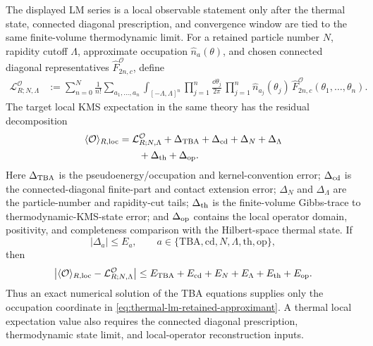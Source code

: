 \begin{controlledapproximation}
\label{ca:thermal-lm-one-point-reconstruction-package}
The displayed LM series is a local observable statement only after the thermal
state, connected diagonal prescription, and convergence window are tied to the
same finite-volume thermodynamic limit.  For a retained
particle number \(N\), rapidity cutoff \(\Lambda\), approximate occupation
\(\widehat n_a(\theta)\), and chosen connected diagonal representatives
\(\widehat F^{\mathcal O}_{2n,c}\), define
\begin{equation}
\begin{aligned}
  \mathcal L^{\mathcal O}_{R;N,\Lambda}
  &:=
  \sum_{n=0}^{N}\frac{1}{n!}
  \sum_{a_1,\ldots,a_n}
  \int_{[-\Lambda,\Lambda]^n}
  \prod_{j=1}^n\frac{\dd\theta_j}{2\pi}\,
  \prod_{j=1}^n\widehat n_{a_j}(\theta_j)\,
  \widehat F^{\mathcal O}_{2n,c}(\theta_1,\ldots,\theta_n).
\end{aligned}
  \label{eq:thermal-lm-retained-approximant}
\end{equation}
The target local KMS expectation in the same theory has the residual
decomposition
\begin{equation}
\begin{aligned}
  \langle\mathcal O\rangle_{R,{\rm loc}}
  &=
  \mathcal L^{\mathcal O}_{R;N,\Lambda}
  +\Delta_{\rm TBA}
  +\Delta_{\rm cd}
  +\Delta_N
  +\Delta_\Lambda  \\
  &\qquad
  +\Delta_{\rm th}
  +\Delta_{\rm op}.
\end{aligned}
  \label{eq:thermal-lm-residual-decomposition}
\end{equation}
Here \(\Delta_{\rm TBA}\) is the pseudoenergy/occupation and kernel-convention
error; \(\Delta_{\rm cd}\) is the connected-diagonal finite-part and contact
extension error; \(\Delta_N\) and \(\Delta_\Lambda\) are the particle-number
and rapidity-cut tails; \(\Delta_{\rm th}\) is the finite-volume Gibbs-trace to
thermodynamic-KMS-state error; and \(\Delta_{\rm op}\) contains the local
operator domain, positivity, and completeness comparison with the Hilbert-space
thermal state.  If
\begin{equation}
  |\Delta_a|\le E_a,
  \qquad
  a\in\{\mathrm{TBA},\mathrm{cd},N,\Lambda,\mathrm{th},\mathrm{op}\},
  \label{eq:thermal-lm-component-bounds}
\end{equation}
then
\begin{equation}
  \left|
  \langle\mathcal O\rangle_{R,{\rm loc}}
  -
  \mathcal L^{\mathcal O}_{R;N,\Lambda}
  \right|
  \le
  E_{\rm TBA}+E_{\rm cd}+E_N+E_\Lambda+E_{\rm th}+E_{\rm op}.
  \label{eq:thermal-lm-total-bound}
\end{equation}
Thus an exact numerical solution of the TBA equations supplies only the
occupation coordinate in
\eqref{eq:thermal-lm-retained-approximant}.  A thermal local expectation value
also requires the connected diagonal prescription, thermodynamic state limit,
and local-operator reconstruction inputs.
\end{controlledapproximation}

